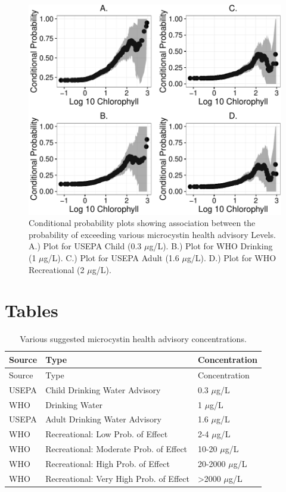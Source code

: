 \documentclass[11pt,]{article}
\begin{document}
\begin{figure}[htbp]
\centering
\includegraphics{manuscript_files/figure-latex/epa_child_cp_plot-1.pdf}
\caption{Conditional probability plots showing association between the
probability of exceeding various microcystin health advisory Levels. A.)
Plot for USEPA Child (0.3 \(\mu\)g/L). B.) Plot for WHO Drinking (1
\(\mu\)g/L). C.) Plot for USEPA Adult (1.6 \(\mu\)g/L). D.) Plot for WHO
Recreational (2 \(\mu\)g/L). \label{fig:multi_cp_plot}}
\end{figure}

\newpage

\section{Tables}\label{tables}

\begin{longtable}[c]{@{}lll@{}}
\caption{Various suggested microcystin health advisory concentrations.
\label{tab:microcystin_levels}}\tabularnewline
\toprule
Source & Type & Concentration\tabularnewline
\midrule
\endfirsthead
\toprule
Source & Type & Concentration\tabularnewline
\midrule
\endhead
USEPA & Child Drinking Water Advisory & 0.3 \(\mu\)g/L\tabularnewline
WHO & Drinking Water & 1 \(\mu\)g/L\tabularnewline
USEPA & Adult Drinking Water Advisory & 1.6 \(\mu\)g/L\tabularnewline
WHO & Recreational: Low Prob. of Effect & 2-4 \(\mu\)g/L\tabularnewline
WHO & Recreational: Moderate Prob. of Effect & 10-20
\(\mu\)g/L\tabularnewline
WHO & Recreational: High Prob. of Effect & 20-2000
\(\mu\)g/L\tabularnewline
WHO & Recreational: Very High Prob. of Effect & \textgreater{}2000
\(\mu\)g/L\tabularnewline
\bottomrule
\end{longtable}
\end{document}
